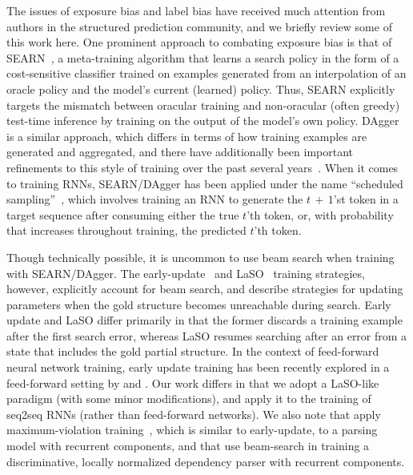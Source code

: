 The issues of exposure bias and label bias have received much
attention from authors in the structured prediction community, and we
briefly review some of this work here. One prominent approach to
combating exposure bias is that of SEARN~\cite{daume09search}, a
meta-training algorithm that learns a search policy in the form of a
cost-sensitive classifier trained on examples generated from an
interpolation of an oracle policy and the model's current (learned)
policy. Thus, SEARN explicitly targets the mismatch between oracular
training and non-oracular (often greedy) test-time inference by
training on the output of the model's own
policy. DAgger~\cite{ross11a} is a similar approach, which differs in
terms of how training examples are generated and aggregated, and there
have additionally been important refinements to this style of training
over the past several years~\cite{chang15efficient}. When it comes to
training RNNs, SEARN/DAgger has been applied under the name
``scheduled sampling''~\cite{bengio15scheduled}, which involves
training an RNN to generate the $t\,{+}\,1$'st token in a target
sequence after consuming either the true $t$'th token, or, with
probability that increases throughout training, the predicted $t$'th
token.

Though technically possible, it is uncommon to use beam search when
training with SEARN/DAgger. The
early-update~\cite{collins04incremental} and
LaSO~\cite{daume05learning} training strategies, however, explicitly
account for beam search, and describe strategies for updating
parameters when the gold structure becomes unreachable during
search. Early update and LaSO differ primarily in that the former
discards a training example after the first search error, whereas LaSO
resumes searching after an error from a state that includes the gold
partial structure. In the context of feed-forward neural network
training, early update training has been recently explored in a
feed-forward setting by  and
. Our work differs in that we adopt a
LaSO-like paradigm (with some minor modifications), and apply it to
the training of seq2seq RNNs (rather than feed-forward networks). We
also note that  apply
maximum-violation training~\cite{huang12structured}, which is similar
to early-update, to a parsing model with 
recurrent components, and that  use
beam-search in training a discriminative, locally normalized
dependency parser with recurrent components.

